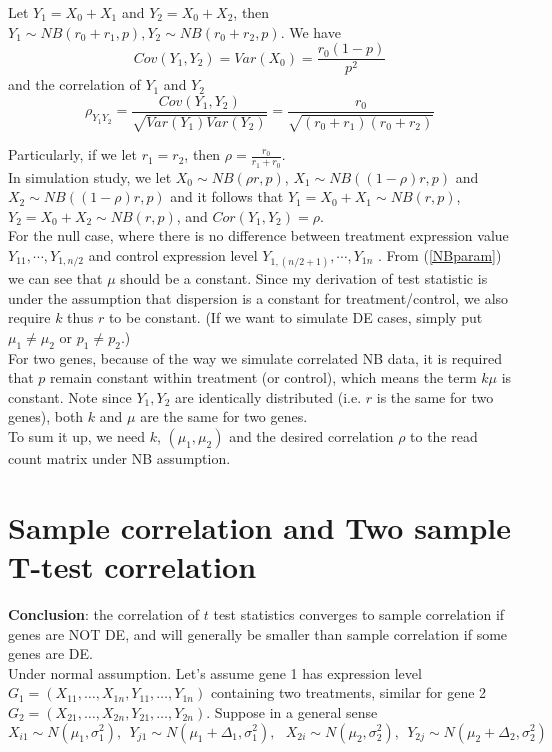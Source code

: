 \documentclass[12pt,oneside]{book}
\begin{document}
Let $Y_1 = X_0 + X_1$ and $Y_2 = X_0 + X_2$, then $Y_1 \sim NB(r_0 + r_1, p),   Y_2 \sim NB(r_0 + r_2, p)$.  We have 
\[Cov(Y_1, Y_2) = Var(X_0) = \frac{r_0(1-p)}{p^2}\]
and the correlation of $Y_1$ and $Y_2$
\[\rho_{Y_1Y_2} = \frac{Cov(Y_1, Y_2)}{\sqrt{Var(Y_1)Var(Y_2)}} = \frac{r_0}{\sqrt{(r_0 + r_1)(r_0 + r_2)}}\]

Particularly, if we let $r_1= r_2$, then $\rho = \frac{r_0}{r_1 + r_0}$.    \\

In simulation study, we let $X_0 \sim NB(\rho r, p)$, $X_1 \sim NB((1-\rho)r, p)$ and $X_2 \sim NB((1-\rho)r, p)$
and it follows that $Y_1 =X_0 + X_1 \sim NB(r, p)$, $Y_2 =X_0 + X_2 \sim NB(r, p)$, and $Cor(Y_1, Y_2) = \rho$.\\

For the null case, where there is no difference between treatment expression value $Y_{11}, \cdots, Y_{1,n/2}$ and control expression level $Y_{1, (n/2 +1)}, \cdots, Y_{1n}$ . From (\ref{NBparam}) we can see that $\mu$ should be a constant. Since my derivation of test statistic is under the assumption that dispersion is a constant for treatment/control, we also require $k$ thus $r$ to be constant.  (If we want to simulate DE cases, simply put $\mu_1\neq \mu_2$ or $p_1 \neq p_2$.) \\

For two genes, because of the way we simulate correlated NB data, it is required that $p$ remain constant within treatment (or control), which means the term $k\mu$ is constant. Note since $Y_1, Y_2$ are identically distributed (i.e. $r$ is the same for two genes), both $k$ and $\mu$ are the same for two genes. \\

To sum it up, we need $k$, $(\mu_1, \mu_2)$ and the desired correlation $\rho$ to the read count matrix under NB assumption.


\section*{ Sample correlation and Two sample T-test correlation}
\textbf{Conclusion}:  the correlation of $t$ test statistics converges to sample correlation if genes are NOT DE, and will generally be smaller than sample correlation if some genes are DE. \\

Under normal assumption. Let's assume gene 1 has expression level $G_1 = (X_{11}, \ldots, X_{1n}, Y_{11}, \ldots, Y_{1n})$ containing two treatments, similar for gene 2 $G_2 = (X_{21}, \ldots, X_{2n}, Y_{21}, \ldots, Y_{2n})$. Suppose in a general sense
\begin{equation}\label{assumption1}
  X_{i1}\sim N(\mu_1, \sigma^2_1), ~~ Y_{j1}\sim N(\mu_1 + \Delta_1, \sigma^2_1), ~~~X_{2i}\sim N(\mu_2, \sigma^2_2), ~~ Y_{2j}\sim N(\mu_2 + \Delta_2, \sigma^2_2)
\end{equation}
\end{document}
